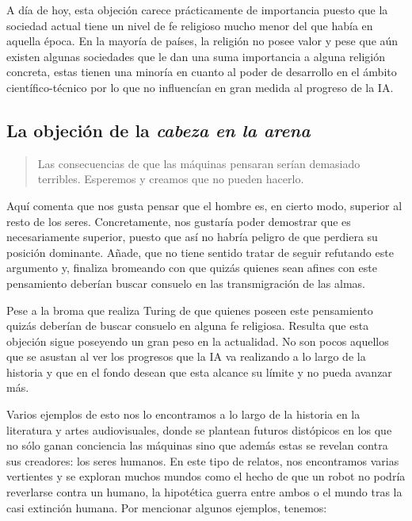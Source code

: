 \documentclass[12pt,a4paper]{article}
\begin{document}
A día de hoy, esta objeción carece prácticamente de importancia puesto que la sociedad actual tiene un nivel de fe religioso mucho menor del que había en aquella época. En la mayoría de países, la religión no posee valor y pese que aún existen algunas sociedades que le dan una suma importancia a alguna religión concreta, estas tienen una minoría en cuanto al poder de desarrollo en el ámbito científico-técnico por lo que no influencían en gran medida al progreso de la IA.

\subsection{La objeción de la \emph{cabeza en la arena}}
\begin{quote}\small Las consecuencias de que las máquinas pensaran serían demasiado terribles. Esperemos y creamos que no pueden hacerlo.\end{quote}

Aquí comenta que nos gusta pensar que el hombre es, en cierto modo, superior al resto de los seres. Concretamente, nos gustaría poder demostrar que es necesariamente superior, puesto que así no habría peligro de que perdiera su posición dominante. Añade, que no tiene sentido tratar de seguir refutando este argumento y, finaliza bromeando con que quizás quienes sean afines con este pensamiento deberían buscar consuelo en las transmigración de las almas.

Pese a la broma que realiza Turing de que quienes poseen este pensamiento quizás deberían de buscar consuelo en alguna fe religiosa. Resulta que esta objeción sigue poseyendo un gran peso en la actualidad. No son pocos aquellos que se asustan al ver los progresos que la IA va realizando a lo largo de la historia y que en el fondo desean que esta alcance su límite y no pueda avanzar más.

Varios ejemplos de esto nos lo encontramos a lo largo de la historia en la literatura y artes audiovisuales, donde se plantean futuros distópicos en los que no sólo ganan conciencia las máquinas sino que además estas se revelan contra sus creadores: los seres humanos. En este tipo de relatos, nos encontramos varias vertientes y se exploran muchos mundos como el hecho de que un robot no podría reverlarse contra un humano, la hipotética guerra entre ambos o el mundo tras la casi extinción humana. Por mencionar algunos ejemplos, tenemos:
\end{document}
